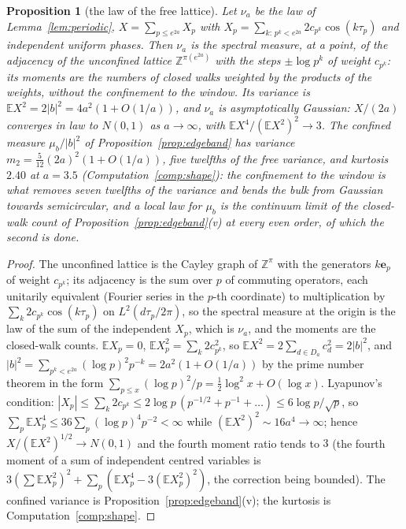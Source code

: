 \documentclass[11pt]{article}
\newtheorem{proposition}[theorem]{Proposition}
\theoremstyle{definition}
\theoremstyle{remark}
\begin{document}
\begin{proposition}[the law of the free lattice]\label{prop:freelaw}
Let $\nu_a$ be the law of Lemma~\ref{lem:periodic}, $X=\sum_{p\le e^{2a}}X_p$ with $X_p=\sum_{k:\,p^k<e^{2a}}2c_{p^k}\cos(k\tau_p)$ and independent uniform phases. Then $\nu_a$ is the spectral measure, at a point, of the adjacency of the unconfined lattice $\mathbb Z^{\pi(e^{2a})}$ with the steps $\pm\log p^k$ of weight $c_{p^k}$: its moments are the numbers of closed walks weighted by the products of the weights, without the confinement to the window. Its variance is $\mathbb EX^2=2|b|^2=4a^2(1+O(1/a))$, and $\nu_a$ is asymptotically Gaussian: $X/(2a)$ converges in law to $N(0,1)$ as $a\to\infty$, with $\mathbb EX^4/(\mathbb EX^2)^2\to3$. The confined measure $\mu_b/|b|^2$ of Proposition~\ref{prop:edgeband} has variance $m_2=\tfrac5{12}(2a)^2(1+O(1/a))$, five twelfths of the free variance, and kurtosis $2.40$ at $a=3.5$ (Computation~\ref{comp:shape}): the confinement to the window is what removes seven twelfths of the variance and bends the bulk from Gaussian towards semicircular, and a local law for $\mu_b$ is the continuum limit of the closed-walk count of Proposition~\ref{prop:edgeband}(v) at every even order, of which the second is done.
\end{proposition}
\begin{proof}
The unconfined lattice is the Cayley graph of $\mathbb Z^{\pi}$ with the generators $k\mathbf e_p$ of weight $c_{p^k}$; its adjacency is the sum over $p$ of commuting operators, each unitarily equivalent (Fourier series in the $p$-th coordinate) to multiplication by $\sum_k2c_{p^k}\cos(k\tau_p)$ on $L^2(d\tau_p/2\pi)$, so the spectral measure at the origin is the law of the sum of the independent $X_p$, which is $\nu_a$, and the moments are the closed-walk counts. $\mathbb EX_p=0$, $\mathbb EX_p^2=\sum_k2c_{p^k}^2$, so $\mathbb EX^2=2\sum_{d\in D_a}c_d^2=2|b|^2$, and $|b|^2=\sum_{p^k<e^{2a}}(\log p)^2p^{-k}=2a^2(1+O(1/a))$ by the prime number theorem in the form $\sum_{p\le x}(\log p)^2/p=\tfrac12\log^2x+O(\log x)$. Lyapunov's condition: $|X_p|\le\sum_k2c_{p^k}\le2\log p\,(p^{-1/2}+p^{-1}+\dots)\le6\log p/\sqrt p$, so $\sum_p\mathbb EX_p^4\le36\sum_p(\log p)^4p^{-2}<\infty$ while $(\mathbb EX^2)^2\sim16a^4\to\infty$; hence $X/(\mathbb EX^2)^{1/2}\to N(0,1)$ and the fourth moment ratio tends to $3$ (the fourth moment of a sum of independent centred variables is $3(\sum\mathbb EX_p^2)^2+\sum_p(\mathbb EX_p^4-3(\mathbb EX_p^2)^2)$, the correction being bounded). The confined variance is Proposition~\ref{prop:edgeband}(v); the kurtosis is Computation~\ref{comp:shape}.
\end{proof}
\end{document}
